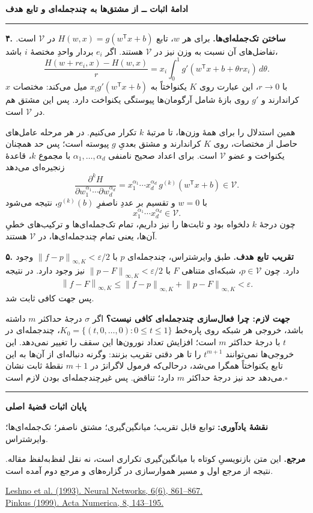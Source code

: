 \documentclass[12pt,a4paper]{article}
\newcommand{\V}{\mathcal V}
\newcommand{\normK}[1]{\left\lVert#1\right\rVert_{\infty,K}}
\newcommand{\step}[1]{\par\Needspace{3\baselineskip}\vspace{3pt}\textbf{#1}\quad}
\begin{document}
\newpage
\noindent\textbf{ادامهٔ اثبات ــ از مشتق‌ها به چندجمله‌ای و تابع هدف}\par
\vspace{4pt}\hrule\vspace{5pt}

\step{۴. ساختن تک‌جمله‌ای‌ها.}
برای هر $w$، تابع $H(w,x)=g(w^{\mathsf T}x+b)$ در $\V$ است. تفاضل‌های آن نسبت به وزن نیز در $\V$ هستند. اگر $e_i$ بردار واحدِ مختصهٔ $i$ باشد،
\[
\frac{H(w+re_i,x)-H(w,x)}r
=x_i\int_0^1g'(w^{\mathsf T}x+b+\theta r x_i)\,d\theta.
\]
با $r\to0$، این عبارت روی $K$ یکنواختاً به $x_i g'(w^{\mathsf T}x+b)$ میل می‌کند: مختصات $x$ کراندارند و $g'$ روی بازهٔ شامل آرگومان‌ها پیوستگی یکنواخت دارد. پس این مشتق هم در $\V$ است.

همین استدلال را برای همهٔ وزن‌ها، تا مرتبهٔ $k$ تکرار می‌کنیم. در هر مرحله عامل‌های حاصل از مختصات، روی $K$ کراندارند و مشتق بعدیِ $g$ پیوسته است؛ پس حد همچنان یکنواخت و عضو $\V$ است. برای اعداد صحیح نامنفی $\alpha_1,\ldots,\alpha_d$ با مجموع $k$، قاعدهٔ زنجیره‌ای می‌دهد
\[
\frac{\partial^k H}{\partial w_1^{\alpha_1}\cdots\partial w_d^{\alpha_d}}
=x_1^{\alpha_1}\cdots x_d^{\alpha_d}\,g^{(k)}(w^{\mathsf T}x+b)\in\V.
\]
با $w=0$ و تقسیم بر عددِ ناصفرِ $g^{(k)}(b)$، نتیجه می‌شود
\[
x_1^{\alpha_1}\cdots x_d^{\alpha_d}\in\V.
\]
چون درجهٔ $k$ دلخواه بود و ثابت‌ها را نیز داریم، تمام تک‌جمله‌ای‌ها و ترکیب‌های خطیِ آن‌ها، یعنی تمام چندجمله‌ای‌ها، در $\V$ هستند.

\step{۵. تقریب تابع هدف.}
طبق وایرشتراس، چندجمله‌ای $p$ با $\normK{f-p}<\varepsilon/2$ وجود دارد. چون $p\in\V$، شبکه‌ای متناهی $F$ با $\normK{p-F}<\varepsilon/2$ نیز وجود دارد. در نتیجه
\[
\normK{f-F}\leq\normK{f-p}+\normK{p-F}<\varepsilon.
\]
پس جهت کافی ثابت شد.

\step{جهت لازم: چرا فعال‌سازی چندجمله‌ای کافی نیست؟}
اگر $\sigma$ درجهٔ حداکثر $m$ داشته باشد، خروجی هر شبکه روی پاره‌خط
$K_0=\{(t,0,\ldots,0):0\leq t\leq1\}$،
چندجمله‌ای در $t$ با درجهٔ حداکثر $m$ است؛ افزایش تعداد نورون‌ها این سقف را تغییر نمی‌دهد.
این خروجی‌ها نمی‌توانند $t^{m+1}$ را تا هر دقتی تقریب بزنند: وگرنه دنباله‌ای از آن‌ها به این تابع یکنواختاً همگرا می‌شد، درحالی‌که فرمول لاگرانژ در $m+1$ نقطهٔ ثابت نشان می‌دهد حد نیز درجهٔ حداکثر $m$ دارد؛ تناقض.
پس غیرچندجمله‌ای بودن لازم است.\hfill$\square$

\vspace{5pt}\hrule\vspace{5pt}
\textbf{پایان اثبات قضیهٔ اصلی}

\textbf{نقشهٔ یادآوری:}
توابع قابل تقریب؛ میانگین‌گیری؛ مشتق ناصفر؛ تک‌جمله‌ای‌ها؛ وایرشتراس.

{\small
\textbf{مرجع.}
این متن بازنویسیِ کوتاه با میانگین‌گیری تکراری است، نه نقل لفظ‌به‌لفظ مقاله. نتیجه از مرجع اول و مسیر هموارسازی در گزاره‌های  و  مرجع دوم آمده است.
\begin{latin}
\href{https://pinkus.net.technion.ac.il/files/2021/02/neural.pdf}{Leshno et al. (1993). Neural Networks, 6(6), 861--867.}\\
\href{https://pinkus.net.technion.ac.il/files/2021/02/acta.pdf}{Pinkus (1999). Acta Numerica, 8, 143--195.}
\end{latin}
}
\end{document}
